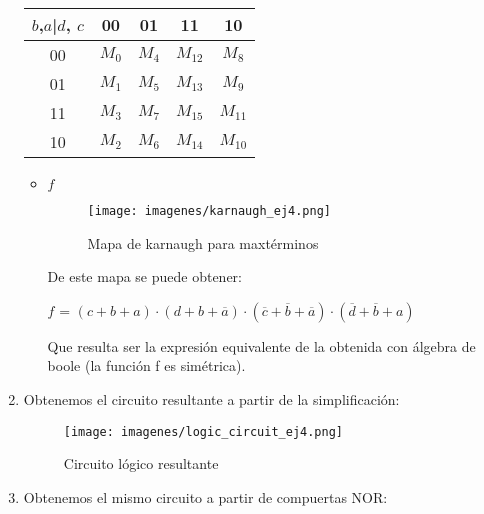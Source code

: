 \documentclass[../../informe/src/main.tex]{subfiles}
\begin{document}
\begin{enumerate}
 			\begin{table}[H] %
				\centering
 				\begin{tabular}{||c c c c c||} 
 					\hline
					$b$,$a$|$d$, $c$ & 00 & 01 & 11 & 10\\ [0.5ex] 
 					\hline\hline
					00 & $M_{0}$ & $M_{4}$ & $M_{12}$ & $M_{8}$\\
					01 & $M_{1}$ & $M_{5}$ & $M_{13}$ & $M_{9}$\\
					11 & $M_{3}$ & $M_{7}$ & $M_{15}$ & $M_{11}$\\
					10 & $M_{2}$ & $M_{6}$ & $M_{14}$ & $M_{10}$\\[1ex] 
					\hline
				\end{tabular}
			\end{table}
			\begin{itemize}
				\item $f$
					\begin{figure}[H]	%
						\centering
						\texttt{[image: imagenes/karnaugh\_ej4.png]}
						\caption{Mapa de karnaugh para maxtérminos}
						\label{fig:ej4_karnaugh_ej4}
					\end{figure}
				De este mapa se puede obtener: \par
				$f$ = $(c + b + a) \cdot 
									(d + b + \overline{a}) \cdot 
									(\overline{c} + \overline{b} + \overline{a}) \cdot 
									(\overline{d} + \overline{b} + a) $ \par
			Que resulta ser la expresión equivalente de la obtenida con álgebra de boole (la función f es simétrica).
			\end{itemize}
			\item Obtenemos el circuito resultante a partir de la simplificación: \par
			\begin{figure}[H]	%
				\centering
				\texttt{[image: imagenes/logic\_circuit\_ej4.png]}
				\caption{Circuito lógico resultante}
				\label{fig:ej4_logic_circuit_ej4}
			\end{figure}
			\item Obtenemos el mismo circuito a partir de compuertas NOR: \par
			
	 \end{enumerate}
	 
\end{document}
